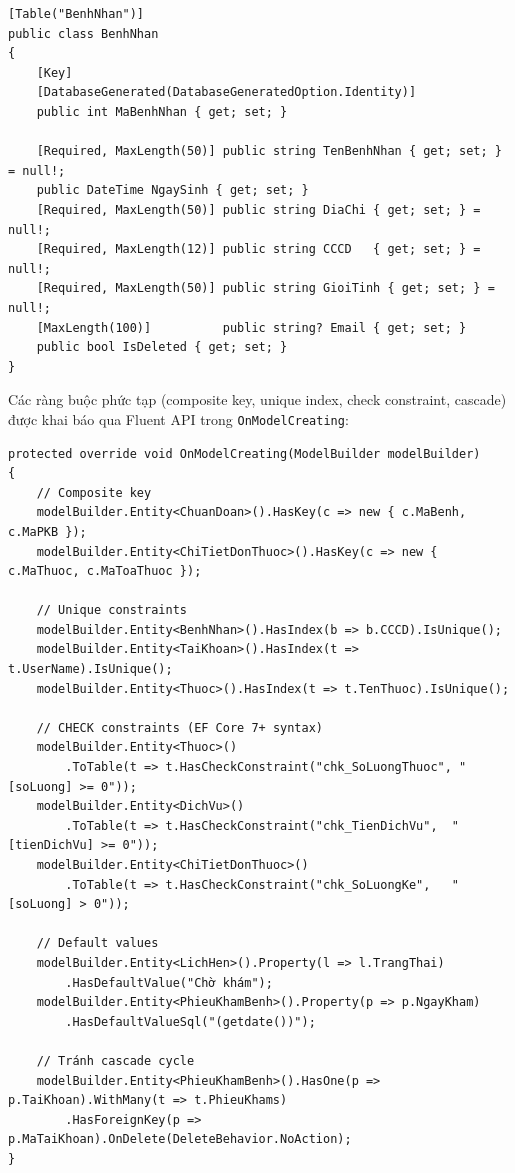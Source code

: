 \documentclass[12pt,a4paper]{report}
\begin{document}
\begin{lstlisting}[style=csharp,caption={Entity BenhNhan -- Code First DataAnnotations}]
[Table("BenhNhan")]
public class BenhNhan
{
    [Key]
    [DatabaseGenerated(DatabaseGeneratedOption.Identity)]
    public int MaBenhNhan { get; set; }

    [Required, MaxLength(50)] public string TenBenhNhan { get; set; } = null!;
    public DateTime NgaySinh { get; set; }
    [Required, MaxLength(50)] public string DiaChi { get; set; } = null!;
    [Required, MaxLength(12)] public string CCCD   { get; set; } = null!;
    [Required, MaxLength(50)] public string GioiTinh { get; set; } = null!;
    [MaxLength(100)]          public string? Email { get; set; }
    public bool IsDeleted { get; set; }
}
\end{lstlisting}

Các ràng buộc phức tạp (composite key, unique index, check constraint, cascade) được khai báo qua Fluent API trong \texttt{OnModelCreating}:

\begin{lstlisting}[style=csharp,caption={Fluent API trong OnModelCreating}]
protected override void OnModelCreating(ModelBuilder modelBuilder)
{
    // Composite key
    modelBuilder.Entity<ChuanDoan>().HasKey(c => new { c.MaBenh, c.MaPKB });
    modelBuilder.Entity<ChiTietDonThuoc>().HasKey(c => new { c.MaThuoc, c.MaToaThuoc });

    // Unique constraints
    modelBuilder.Entity<BenhNhan>().HasIndex(b => b.CCCD).IsUnique();
    modelBuilder.Entity<TaiKhoan>().HasIndex(t => t.UserName).IsUnique();
    modelBuilder.Entity<Thuoc>().HasIndex(t => t.TenThuoc).IsUnique();

    // CHECK constraints (EF Core 7+ syntax)
    modelBuilder.Entity<Thuoc>()
        .ToTable(t => t.HasCheckConstraint("chk_SoLuongThuoc", "[soLuong] >= 0"));
    modelBuilder.Entity<DichVu>()
        .ToTable(t => t.HasCheckConstraint("chk_TienDichVu",  "[tienDichVu] >= 0"));
    modelBuilder.Entity<ChiTietDonThuoc>()
        .ToTable(t => t.HasCheckConstraint("chk_SoLuongKe",   "[soLuong] > 0"));

    // Default values
    modelBuilder.Entity<LichHen>().Property(l => l.TrangThai)
        .HasDefaultValue("Chờ khám");
    modelBuilder.Entity<PhieuKhamBenh>().Property(p => p.NgayKham)
        .HasDefaultValueSql("(getdate())");

    // Tránh cascade cycle
    modelBuilder.Entity<PhieuKhamBenh>().HasOne(p => p.TaiKhoan).WithMany(t => t.PhieuKhams)
        .HasForeignKey(p => p.MaTaiKhoan).OnDelete(DeleteBehavior.NoAction);
}
\end{lstlisting}
\end{document}
